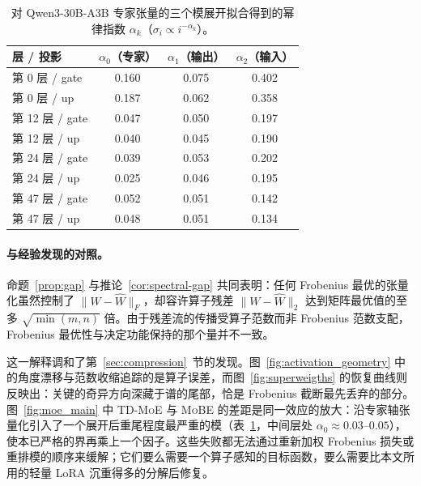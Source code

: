 \begin{table}[t]
\centering
\small
\caption{对 Qwen3-30B-A3B 专家张量的三个模展开拟合得到的幂律指数 $\alpha_k$（$\sigma_i \propto i^{-\alpha_k}$）。}
\label{tab:alpha}
\begin{tabular}{lccc}
\toprule
层 / 投影 & $\alpha_0$（专家） & $\alpha_1$（输出） & $\alpha_2$（输入） \\
\midrule
第 0 层 / gate  & 0.160 & 0.075 & 0.402 \\
第 0 层 / up    & 0.187 & 0.062 & 0.358 \\
第 12 层 / gate & 0.047 & 0.050 & 0.197 \\
第 12 层 / up   & 0.040 & 0.045 & 0.190 \\
第 24 层 / gate & 0.039 & 0.053 & 0.202 \\
第 24 层 / up   & 0.025 & 0.046 & 0.195 \\
第 47 层 / gate & 0.052 & 0.051 & 0.142 \\
第 47 层 / up   & 0.048 & 0.051 & 0.134 \\
\bottomrule
\end{tabular}
\vspace{-2mm}
\end{table}

\paragraph{与经验发现的对照。} 命题~\ref{prop:gap} 与推论~\ref{cor:spectral-gap} 共同表明：任何 Frobenius 最优的张量化虽然控制了 $\|W - \widehat{W}\|_F$，却容许算子残差 $\|W - \widehat{W}\|_2$ 达到矩阵最优值的至多 $\sqrt{\min(m,n)}$ 倍。由于残差流的传播受算子范数而非 Frobenius 范数支配，Frobenius 最优性与决定功能保持的那个量并不一致。

这一解释调和了第~\ref{sec:compression}~节的发现。图~\ref{fig:activation_geometry} 中的角度漂移与范数收缩追踪的是算子误差，而图~\ref{fig:superweigths} 的恢复曲线则反映出：关键的奇异方向深藏于谱的尾部，恰是 Frobenius 截断最先丢弃的部分。图~\ref{fig:moe_main} 中 \textsc{TD-MoE} 与 \textsc{MoBE} 的差距是同一效应的放大：沿专家轴张量化引入了一个展开后重尾程度最严重的模（表~\ref{tab:alpha}，中间层处 $\alpha_0 \approx 0.03\text{--}0.05$），使本已严格的界再乘上一个因子。这些失败都无法通过重新加权 Frobenius 损失或重排模的顺序来缓解；它们要么需要一个算子感知的目标函数，要么需要比本文所用的轻量 LoRA 沉重得多的分解后修复。


